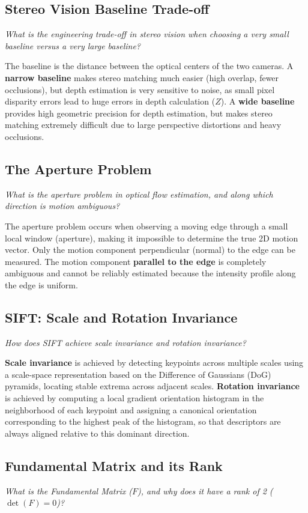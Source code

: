 \subsection{Stereo Vision Baseline Trade-off}
\textit{What is the engineering trade-off in stereo vision when choosing a very small baseline versus a very large baseline?}

The baseline is the distance between the optical centers of the two cameras.
A \textbf{narrow baseline} makes stereo matching much easier (high overlap, fewer occlusions), but depth estimation is very sensitive to noise, as small pixel disparity errors lead to huge errors in depth calculation ($Z$).
A \textbf{wide baseline} provides high geometric precision for depth estimation, but makes stereo matching extremely difficult due to large perspective distortions and heavy occlusions.

\subsection{The Aperture Problem}
\textit{What is the aperture problem in optical flow estimation, and along which direction is motion ambiguous?}

The aperture problem occurs when observing a moving edge through a small local window (aperture), making it impossible to determine the true 2D motion vector. Only the motion component perpendicular (normal) to the edge can be measured. The motion component \textbf{parallel to the edge} is completely ambiguous and cannot be reliably estimated because the intensity profile along the edge is uniform.

\subsection{SIFT: Scale and Rotation Invariance}
\textit{How does SIFT achieve scale invariance and rotation invariance?}

\textbf{Scale invariance} is achieved by detecting keypoints across multiple scales using a scale-space representation based on the Difference of Gaussians (DoG) pyramids, locating stable extrema across adjacent scales.
\textbf{Rotation invariance} is achieved by computing a local gradient orientation histogram in the neighborhood of each keypoint and assigning a canonical orientation corresponding to the highest peak of the histogram, so that descriptors are always aligned relative to this dominant direction.

\subsection{Fundamental Matrix and its Rank}
\textit{What is the Fundamental Matrix ($F$), and why does it have a rank of 2 ($\det(F) = 0$)?}

